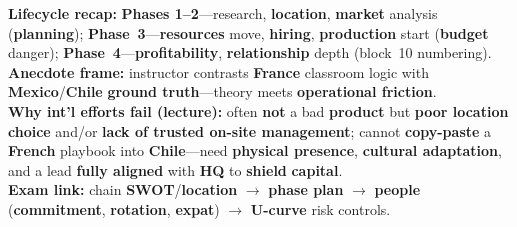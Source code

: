 \documentclass[10pt,a4paper]{article}
\begin{document}
{\textbf{Lifecycle recap:} \textbf{Phases 1--2}---research, \textbf{location}, \textbf{market} analysis (\textbf{planning}); \textbf{Phase~3}---\textbf{resources} move, \textbf{hiring}, \textbf{production} start (\textbf{budget} danger); \textbf{Phase~4}---\textbf{profitability}, \textbf{relationship} depth (block~10 numbering).\\
\textbf{Anecdote frame:} instructor contrasts \textbf{France} classroom logic with \textbf{Mexico}/\textbf{Chile} \textbf{ground truth}---theory meets \textbf{operational friction}.\\
\textbf{Why int'l efforts fail (lecture):} often \textbf{not} a bad \textbf{product} but \textbf{poor location choice} and/or \textbf{lack of trusted on-site management}; cannot \textbf{copy-paste} a \textbf{French} playbook into \textbf{Chile}---need \textbf{physical presence}, \textbf{cultural adaptation}, and a lead \textbf{fully aligned} with \textbf{HQ} to \textbf{shield} \textbf{capital}.\\
\textbf{Exam link:} chain \textbf{SWOT}/\textbf{location} $\rightarrow$ \textbf{phase plan} $\rightarrow$ \textbf{people} (\textbf{commitment}, \textbf{rotation}, \textbf{expat}) $\rightarrow$ \textbf{U-curve} risk controls.
}
\end{document}

